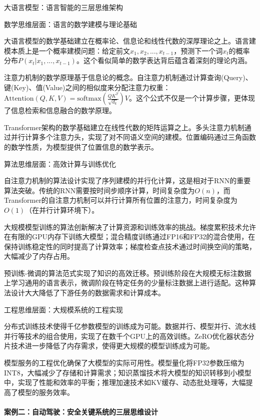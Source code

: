 大语言模型：语言智能的三层思维架构

数学思维层面：语言的数学建模与理论基础

大语言模型的数学基础建立在概率论、信息论和线性代数的深厚理论之上。语言建模本质上是一个概率建模问题：给定前文$x_1, x_2, ..., x_{t-1}$，预测下一个词$x_t$的概率分布$P(x_t|x_1, ..., x_{t-1})$。这个看似简单的数学表达背后蕴含着深刻的理论内涵。

注意力机制的数学原理基于信息论的概念。自注意力机制通过计算查询(Query)、键(Key)、值(Value)之间的相似度来分配注意力权重：$\text{Attention}(Q,K,V) = \text{softmax}(\frac{QK^T}{\sqrt{d_k}})V$。这个公式不仅是一个计算步骤，更体现了信息检索和信息融合的数学原理。

Transformer架构的数学基础建立在线性代数的矩阵运算之上。多头注意力机制通过并行计算多个注意力头，实现了对不同语义空间的建模。位置编码通过三角函数的数学性质，为模型提供了位置信息的数学表示。

算法思维层面：高效计算与训练优化

自注意力机制的算法设计实现了序列建模的并行化计算，这是相对于RNN的重要算法突破。传统的RNN需要按时间步顺序计算，时间复杂度为$O(n)$，而Transformer的自注意力机制可以并行计算所有位置的注意力，时间复杂度为$O(1)$（在并行计算环境下）。

大规模模型训练的算法创新解决了计算资源和训练效率的挑战。梯度累积技术允许在有限的GPU内存下训练大模型；混合精度训练通过FP16和FP32的混合使用，在保持训练稳定性的同时提高了计算效率；梯度检查点技术通过时间换空间的策略，大幅减少了内存占用。

预训练-微调的算法范式实现了知识的高效迁移。预训练阶段在大规模无标注数据上学习通用的语言表示，微调阶段在特定任务的少量标注数据上进行适配。这种算法设计大大降低了下游任务的数据需求和计算成本。

工程思维层面：大规模系统的工程实现

分布式训练技术使得千亿参数模型的训练成为可能。数据并行、模型并行、流水线并行等技术的组合使用，实现了在数千个GPU上的高效训练。ZeRO优化器状态分片技术进一步降低了内存需求，使得更大规模的模型训练成为可能。

模型服务的工程优化确保了大模型的实际可用性。模型量化将FP32参数压缩为INT8，大幅减少了存储和计算需求；知识蒸馏技术将大模型的知识转移到小模型中，实现了性能和效率的平衡；推理加速技术如KV缓存、动态批处理等，大幅提高了模型的服务效率。

\paragraph{案例二：自动驾驶：安全关键系统的三层思维设计}

